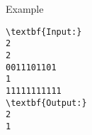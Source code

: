 Example
\begin{verbatim}
\textbf{Input:}
2
2
0011101101
1
11111111111
\textbf{Output:}
2
1\end{verbatim}